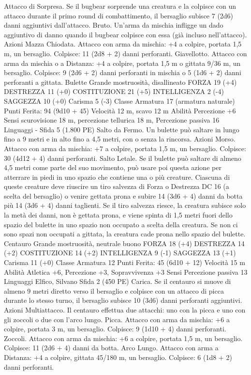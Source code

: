 \begin{multicols}{2}
Attacco di Sorpresa. Se il bugbear sorprende una creatura e la
colpisce con un attacco durante il primo round di combattimento,
il bersaglio subisce 7 (2d6) danni aggiuntivi dall’attacco.
Bruto. Un’arma da mischia infligge un dado aggiuntivo di danno
quando il bugbear colpisce con essa (già incluso nell’attacco).
Azioni
Mazza Chiodata. Attacco con arma da mischia: +4 a colpire,
portata 1,5 m, un bersaglio.
Colpisce: 11 (2d8 + 2) danni perforanti.
Giavellotto. Attacco con arma da mischia o a Distanza: +4 a
colpire, portata 1,5 m o gittata 9/36 m, un bersaglio.
Colpisce: 9 (2d6 + 2) danni perforanti in mischia o 5 (1d6 + 2)
danni perforanti a gittata.
Bulette
Grande mostruosità, disallineato
FORZA 19 (+4)
DESTREZZA 11 (+0)
COSTITUZIONE 21 (+5)
INTELLIGENZA 2 (-4)
SAGGEZZA 10 (+0)
Carisma 5 (-3)
Classe Armatura 17 (armatura naturale)
\hspace*{0pt}\hfill{Punti Ferita}: 94 (9d10 + 45)
Velocità 12 m, scavo 12 m
Abilità Percezione +6
Sensi scurovisione 18 m, percezione tellurica 18 m, Percezione
passiva 16
Linguaggi -
Sfida 5 (1.800 PE)
Salto da Fermo. Un bulette può saltare in lungo fino a 9 metri e
in alto fino a 4,5 metri, con o senza la rincorsa.
Azioni
Morso. Attacco con arma da mischia: +7 a colpire, portata 1,5
m, un bersaglio.
Colpisce: 30 (4d12 + 4) danni perforanti.
Salto Letale. Se il bulette può saltare di almeno 4,5 metri come
parte del suo movimento, può usare poi questa azione per
atterrare in piedi in uno spazio che contiene una o più creature.
Ciascuna di queste creature deve riuscire un tiro salvezza di
Forza o Destrezza DC 16 (a scelta del bersaglio) o venire gettata
prona e subire 14 (3d6 + 4) danni da botta più 14 (3d6 + 4)
danni taglienti. Se il tiro salvezza riesce, la creatura subisce solo
la metà dei danni, non è gettata prona, e viene spinta di 1,5 metri
fuori dello spazio del bulette in uno spazio non occupato a scelta
della creatura. Se non ci sono spazi non occupati a gittata, la
creatura cade prona nello spazio del bulette.
Centauro
Grande mostruosità, neutrale buono
FORZA 18 (+4)
DESTREZZA 14 (+2)
COSTITUZIONE 14 (+2)
INTELLIGENZA 9 (-1)
SAGGEZZA 13 (+1)
Carisma 11 (+0)
Classe Armatura 12
\hspace*{0pt}\hfill{Punti Ferita}: 45 (6d10 + 12)
Velocità 15 m
Abilità Atletica +6, Percezione +3, Sopravvivenza +3
Sensi Percezione passiva 13
Linguaggi Elfico, Silvano
Sfida 2 (450 PE)
Carica. Se il centauro si muove di almeno 9 metri diretto verso il
bersaglio e colpisce con un attacco di picca durante lo stesso
turno, il bersaglio subisce 10 (3d6) danni perforanti aggiuntivi.
Azioni
Multiattacco. Il centauro effettua due attacchi: uno con la picca e
uno con gli zoccoli o due con l’arco lungo.
Picca. Attacco con arma da mischia: +6 a colpire, portata 3 m,
un bersaglio.
Colpisce: 9 (1d10 + 4) danni perforanti.
Zoccoli. Attacco con arma da mischia: +6 a colpire, portata 1,5
m, un bersaglio.
Colpisce: 11 (2d6 + 4) danni da botta.
Arco Lungo. Attacco con arma a Distanza: +4 a colpire, gittata
45/180 m, un bersaglio.
Colpisce: 6 (1d8 + 2) danni perforanti.
 

\end{multicols}
